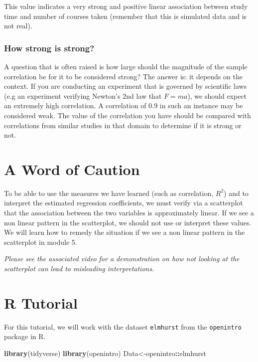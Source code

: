 \documentclass[
]{book}
\newenvironment{Shaded}{\begin{snugshade}}{\end{snugshade}}
\newcommand{\FunctionTok}[1]{\textcolor[rgb]{0.13,0.29,0.53}{\textbf{#1}}}
\newcommand{\NormalTok}[1]{#1}
\newcommand{\OtherTok}[1]{\textcolor[rgb]{0.56,0.35,0.01}{#1}}
\newcommand{\SpecialCharTok}[1]{\textcolor[rgb]{0.81,0.36,0.00}{\textbf{#1}}}
\begin{document}
This value indicates a very strong and positive linear association between study time and number of courses taken (remember that this is simulated data and is not real).

\subsubsection{How strong is strong?}\label{how-strong-is-strong}

A question that is often raised is how large should the magnitude of the sample correlation be for it to be considered strong? The answer is: it depends on the context. If you are conducting an experiment that is governed by scientific laws (e.g an experiment verifying Newton's 2nd law that \(F = ma\)), we should expect an extremely high correlation. A correlation of 0.9 in such an instance may be considered weak. The value of the correlation you have should be compared with correlations from similar studies in that domain to determine if it is strong or not.

\section{A Word of Caution}\label{a-word-of-caution}

To be able to use the measures we have learned (such as correlation, \(R^2\)) and to interpret the estimated regression coefficients, we must verify via a scatterplot that the association between the two variables is approximately linear. If we see a non linear pattern in the scatterplot, we should not use or interpret these values. We will learn how to remedy the situation if we see a non linear pattern in the scatterplot in module 5.

\emph{Please see the associated video for a demonstration on how not looking at the scatterplot can lead to misleading interpretations.}

\section{R Tutorial}\label{r-tutorial}

For this tutorial, we will work with the dataset \texttt{elmhurst} from the \texttt{openintro} package in R.

\begin{Shaded}
\begin{Highlighting}[]
\FunctionTok{library}\NormalTok{(tidyverse)}
\FunctionTok{library}\NormalTok{(openintro)}
\NormalTok{Data}\OtherTok{\textless{}{-}}\NormalTok{openintro}\SpecialCharTok{::}\NormalTok{elmhurst}
\end{Highlighting}
\end{Shaded}
\end{document}

